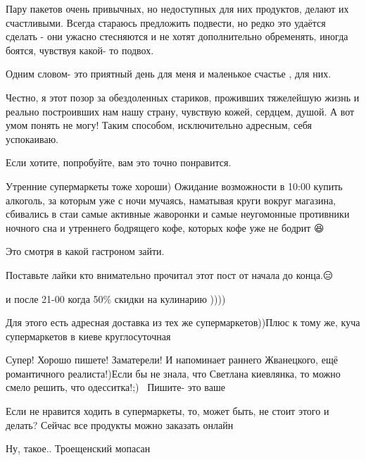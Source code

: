 \begin{itemize}
Пару пакетов очень привычных, но недоступных для них продуктов, делают их
счастливыми. Всегда стараюсь предложить подвести, но редко это удаётся сделать
- они ужасно стесняются и не хотят дополнительно обременять, иногда боятся,
чувствуя какой- то подвох.

Одним словом- это приятный день для меня и маленькое счастье , для них.

Честно, я этот позор за обездоленных стариков, проживших тяжелейшую жизнь и
реально построивших нам нашу страну, чувствую кожей, сердцем, душой. А вот умом
понять не могу! Таким способом, исключительно адресным, себя успокаиваю.

Если хотите, попробуйте, вам это точно понравится.


Утренние супермаркеты тоже хороши) Ожидание возможности в 10:00 купить
алкоголь, за которым уже с ночи мучаясь, наматывая круги вокруг магазина,
сбивались в стаи самые активные жаворонки и самые неугомонные противники
ночного сна и утреннего бодрящего кофе, которых кофе уже не бодрит 😆


Это смотря в какой гастроном зайти.

Поставьте лайки кто внимательно прочитал этот пост от начала до конца.😑

и после 21-00 когда 50\% скидки на кулинарию ))))

Для этого есть адресная доставка из тех же супермаркетов))Плюс к тому же, куча супермаркетов в киеве круглосуточная


Супер! Хорошо пишете! Заматерели! И напоминает раннего Жванецкого, ещё
романтичного реалиста!)Если бы не знала, что Светлана киевлянка, то можно смело
решить, что одесситка!;)👏💪🌟Пишите- это ваше👌🏻

Если не нравится ходить в супермаркеты, то, может быть, не стоит этого и делать? Сейчас все продукты можно заказать онлайн

Ну, такое.. Троещенский мопасан


\end{itemize}
